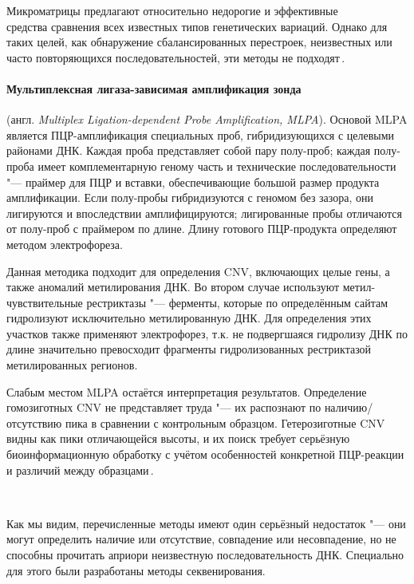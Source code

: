 \documentclass[a4paper,14pt]{extarticle}
\newcommand{\ecitep}[1]{\textenglish{\citep{#1}}}
\newcommand{\engterm}[1]{англ. \textenglish{\textit{#1}}}
\begin{document}
Микроматрицы предлагают относительно недорогие и эффективные\\средства сравнения всех известных типов генетических вариаций.
Однако для таких целей, как обнаружение сбалансированных перестроек, неизвестных или часто повторяющихся последовательностей, эти методы не подходят\,\ecitep{Gresham_2008}.

\paragraph{Мультиплексная лигаза-зависимая амплификация зонда} (\engterm{Multiplex Ligation-dependent Probe Amplification, MLPA}).
Основой MLPA является ПЦР\hyp{}амплификация специальных проб, гибридизующихся с целевыми районами ДНК.
Каждая проба представляет собой пару полу-проб;
каждая полу-проба имеет комплементарную геному часть и технические последовательности "--- праймер для ПЦР и вставки, обеспечивающие большой размер продукта амплификации.
Если полу-пробы гибридизуются с геномом без зазора, они лигируются и впоследствии амплифицируются;
лигированные пробы отличаются от полу-проб с праймером по длине.
Длину готового ПЦР\hyp{}продукта определяют методом электрофореза.

Данная методика подходит для определения CNV, включающих целые гены, а также аномалий метилирования ДНК.
Во втором случае используют метил-чувствительные рестриктазы "--- ферменты, которые по определённым сайтам гидролизуют исключительно метилированную ДНК.
Для определения этих участков также применяют электрофорез, т.к. не подвергшаяся гидролизу ДНК по длине значительно превосходит фрагменты гидролизованных рестриктазой метилированных регионов.

Слабым местом MLPA остаётся интерпретация результатов.
Определение гомозиготных CNV не представляет труда "--- их распознают по наличию/отсутствию пика в сравнении с контрольным образцом.
Гетерозиготные CNV видны как пики отличающейся высоты, и их поиск требует серьёзную биоинформационную обработку с учётом особенностей конкретной ПЦР\hyp{}реакции и различий между образцами\,\ecitep{Stuppia_2012}.

~

Как мы видим, перечисленные методы имеют один серьёзный недостаток "--- они могут определить наличие или отсутствие, совпадение или несовпадение, но не способны прочитать априори неизвестную последовательность ДНК.
Специально для этого были разработаны методы секвенирования.
\end{document}
